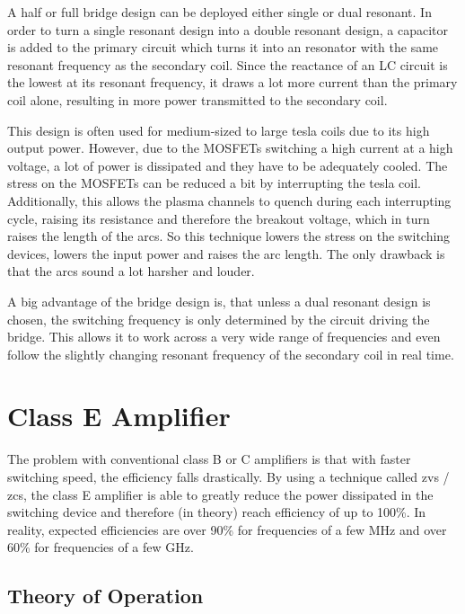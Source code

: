 A half or full bridge design can be deployed either single or dual resonant. In order to turn a single resonant design into a double resonant design, a capacitor is added to the primary circuit which turns it into an resonator with the same resonant frequency as the secondary coil. Since the reactance of an LC circuit is the lowest at its resonant frequency, it draws a lot more current than the primary coil alone, resulting in more power transmitted to the secondary coil.

This design is often used for medium-sized to large tesla coils due to its high output power. However, due to the MOSFETs switching a high current at a high voltage, a lot of power is dissipated and they have to be adequately cooled. The stress on the MOSFETs can be reduced a bit by interrupting the tesla coil. Additionally, this allows the plasma channels to quench during each interrupting cycle, raising its resistance and therefore the breakout voltage, which in turn raises the length of the arcs. So this technique lowers the stress on the switching devices, lowers the input power and raises the arc length. The only drawback is that the arcs sound a lot harsher and louder.

A big advantage of the bridge design is, that unless a dual resonant design is chosen, the switching frequency is only determined by the circuit driving the bridge. This allows it to work across a very wide range of frequencies and even follow the slightly changing resonant frequency of the secondary coil in real time.


\section{Class E Amplifier}

The problem with conventional class B or C amplifiers is that with faster switching speed, the efficiency falls drastically. By using a technique called \gls{zvs} / \gls{zcs}, the class E amplifier is able to greatly reduce the power dissipated in the switching device and therefore (in theory) reach efficiency of up to 100\%. In reality, expected efficiencies are over 90\% for frequencies of a few MHz and over 60\% for frequencies of a few GHz.

\subsection{Theory of Operation}

